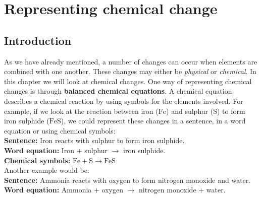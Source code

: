          \chapter{Representing chemical change}
    \label{337cc49099d6e82169c54b5d0fc3878f}
         \section{Introduction}
    \nopagebreak
      \label{m38721*id62175}As we have already mentioned, a number of changes can occur when elements are combined with one another. These changes may either be \textsl{physical} or \textsl{chemical}. In this chapter we will look at chemical changes. One way of representing chemical changes is through \textbf{balanced chemical equations}. A chemical equation describes a chemical reaction by using symbols for the elements involved. For example, if we look at the reaction between iron ($\text{Fe}$) and sulphur ($\text{S}$) to form iron sulphide ($\text{FeS}$), we could represent these changes in a sentence, in a word equation or using chemical symbols:\\ \newline
\textbf{Sentence:} Iron reacts with sulphur to form iron sulphide.\\
\textbf{Word equation:} Iron $+$ sulphur $\to$ iron sulphide. \\
\textbf{Chemical symbols:} $\text{Fe} + \text{S} \to \text{FeS}$\\ \newline
\label{m38721*id62582}Another example would be:\\ \newline
\textbf{Sentence:} Ammonia reacts with oxygen to form nitrogen monoxide and water.\\
\textbf{Word equation:} Ammonia $+$ oxygen $\to$ nitrogen monoxide $+$ water.\\
